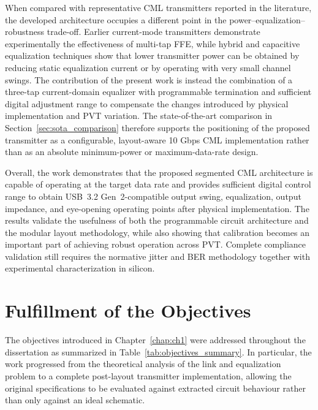 When compared with representative \ac{CML} transmitters reported in the literature, the developed architecture occupies a different point in the power--equalization--robustness trade-off. Earlier current-mode transmitters demonstrate experimentally the effectiveness of multi-tap \ac{FFE}, while hybrid and capacitive equalization techniques show that lower transmitter power can be obtained by reducing static equalization current or by operating with very small channel swings. The contribution of the present work is instead the combination of a three-tap current-domain equalizer with programmable termination and sufficient digital adjustment range to compensate the changes introduced by physical implementation and \ac{PVT} variation. The state-of-the-art comparison in Section~\ref{sec:sota_comparison} therefore supports the positioning of the proposed transmitter as a configurable, layout-aware 10 Gbps \ac{CML} implementation rather than as an absolute minimum-power or maximum-data-rate design.

Overall, the work demonstrates that the proposed segmented \ac{CML} architecture is capable of operating at the target data rate and provides sufficient digital control range to obtain \ac{USB}~3.2 Gen~2-compatible output swing, equalization, output impedance, and eye-opening operating points after physical implementation. The results validate the usefulness of both the programmable circuit architecture and the modular layout methodology, while also showing that calibration becomes an important part of achieving robust operation across \ac{PVT}. Complete compliance validation still requires the normative jitter and \ac{BER} methodology together with experimental characterization in silicon.

\section{Fulfillment of the Objectives}
The objectives introduced in Chapter~\ref{chap:ch1} were addressed throughout the dissertation as summarized in Table~\ref{tab:objectives_summary}. In particular, the work progressed from the theoretical analysis of the link and equalization problem to a complete post-layout transmitter implementation, allowing the original specifications to be evaluated against extracted circuit behaviour rather than only against an ideal schematic.

